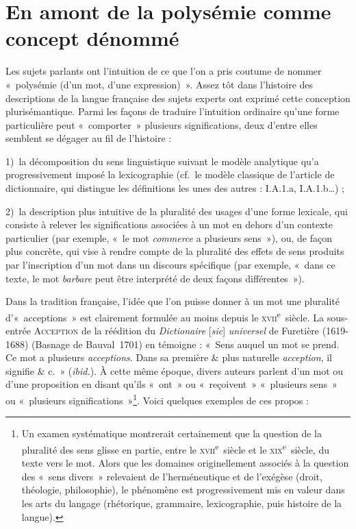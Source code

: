 \documentclass[output=paper]{langsci/langscibook}
\begin{document}
\section{En amont de la polysémie comme concept dénommé}
Les sujets parlants ont l’intuition de ce que l’on a pris coutume de nommer «~polysémie (d’un mot, d’une expression)~». Assez tôt dans l’histoire des descriptions de la langue française des sujets experts ont exprimé cette conception plurisémantique. Parmi les façons de traduire l’intuition ordinaire qu’une forme particulière peut «~comporter~» plusieurs significations, deux d’entre elles semblent se dégager au fil de l’histoire :\medskip

1)~la décomposition du sens linguistique suivant le modèle analytique qu’a progressivement imposé la lexicographie (cf.~le modèle classique de l’article de dictionnaire, qui distingue les définitions les unes des autres : I.A.1.a, I.A.1.b…) ;\medskip

2)~la description plus intuitive de la pluralité des usages d’une forme lexicale, qui consiste à relever les significations associées à un mot en dehors d’un contexte particulier (par exemple, «~le mot \textit{commerce} a plusieurs sens~»), ou, de façon plus concrète, qui vise à rendre compte de la pluralité des effets de sens produits par l’inscription d’un mot dans un discours spécifique (par exemple, «~dans ce texte, le mot \textit{barbare} peut être interprété de deux façons différentes~»).

Dans la tradition française, l’idée que l’on puisse donner à un mot une pluralité d’«~acceptions~» est clairement formulée au moins depuis le \textsc{xvii}\textsuperscript{e}~siècle. La sous-entrée \textsc{Acception} de la réédition du \textit{Dictionaire} [\textit{sic}] \textit{universel} de Furetière (1619-1688) (Basnage de Bauval~1701) en témoigne : «~Sens auquel un mot se prend. Ce mot a plusieurs \textit{acceptions}. Dans sa première \& plus naturelle \textit{acception}, il signifie \& c.~» (\textit{ibid.}). À cette même époque, divers auteurs parlent d’un mot ou d’une proposition en disant qu’ils «~ont~» ou «~reçoivent~» «~plusieurs sens~» ou «~plusieurs significations~»\footnote{ \textrm{Un examen systématique montrerait certainement que la question de la pluralité des sens glisse en partie, entre le} \textrm{\textsc{xvii}}\textrm{\textsuperscript{e}}\textrm{~siècle}\textrm{ }\textrm{et le} \textrm{\textsc{xix}}\textrm{\textsuperscript{e}}\textrm{~siècle, du texte vers le mot. Alors que les domaines originellement associés à la question des «~sens divers~» relevaient de l’herméneutique et de l’exégèse (droit, théologie, philosophie), le phénomène est progressivement mis en valeur dans les arts du langage (rhétorique, grammaire, lexicographie, puis histoire de la langue).}}. Voici quelques exemples de ces propos :
\end{document}
